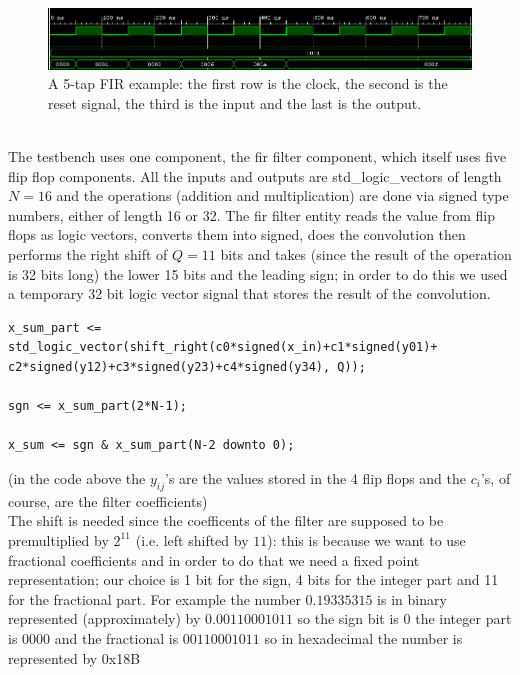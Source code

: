 \documentclass[a4paper,12pt]{article}
\begin{document}
\begin{figure}[h!]
	\begin{flushleft}
		\includegraphics[width=1.2\linewidth,keepaspectratio]{fir5ex.png}
	\end{flushleft}	
	\caption{A 5-tap FIR example: the first row is the clock, the second is the reset signal, the third is the input and the last is the output.}
	\label{fig:fir5ex}
\end{figure}\\
The testbench uses one component, the fir filter component,
which itself uses five flip flop components. All the inputs and outputs are std\_logic\_vectors of length $N=16$ and the operations (addition and multiplication) are done via signed type numbers, either of length 16 or 32. The fir filter entity reads the value from flip flops as logic vectors, converts them into signed, does the convolution then performs the right shift of $Q=11$ bits and takes (since the result of the operation is 32 bits long) the lower 15 bits and the leading sign; in order to do this we used a temporary 32 bit logic vector signal that stores the result of the convolution.
\begin{lstlisting}[style=vhdl]
x_sum_part <=
std_logic_vector(shift_right(c0*signed(x_in)+c1*signed(y01)+
c2*signed(y12)+c3*signed(y23)+c4*signed(y34), Q));

sgn <= x_sum_part(2*N-1);

x_sum <= sgn & x_sum_part(N-2 downto 0);
\end{lstlisting}
(in the code above the $y_{ij}$'s are the values stored in the 4 flip flops and the $c_i$'s, of course, are the filter coefficients)\\
The shift is needed since the coefficents of the filter are supposed to be premultiplied by $2^{11}$ (i.e. left shifted by $11$): this is because we want to use fractional coefficients and in order to do that we need a fixed point representation; our choice is 1 bit for the sign, 4 bits for the integer part and 11 for the fractional part. For example the number $0.19335315$ is in binary represented (approximately) by $0.00110001011$ so the sign bit is $0$ the integer part is $0000$ and the fractional is $00110001011$ so in hexadecimal the number is represented by 0x18B\\
\end{document}
